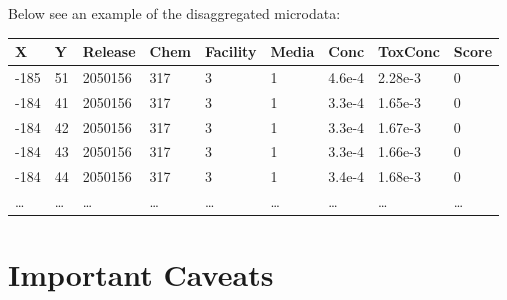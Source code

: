 \documentclass[12pt,twoside]{dukestatscithesis}
\theoremstyle{definition}
\theoremstyle{definition}
\theoremstyle{definition}
\theoremstyle{remark}
\begin{document}
Below see an example of the disaggregated microdata:
\begin{longtable}[]{@{}lllllllll@{}}
\toprule
X & Y & Release & Chem & Facility & Media & Conc & ToxConc &
Score\tabularnewline
\midrule
\endhead
-185 & 51 & 2050156 & 317 & 3 & 1 & 4.6e-4 & 2.28e-3 & 0\tabularnewline
-184 & 41 & 2050156 & 317 & 3 & 1 & 3.3e-4 & 1.65e-3 & 0\tabularnewline
-184 & 42 & 2050156 & 317 & 3 & 1 & 3.3e-4 & 1.67e-3 & 0\tabularnewline
-184 & 43 & 2050156 & 317 & 3 & 1 & 3.3e-4 & 1.66e-3 & 0\tabularnewline
-184 & 44 & 2050156 & 317 & 3 & 1 & 3.4e-4 & 1.68e-3 & 0\tabularnewline
\ldots{} & \ldots{} & \ldots{} & \ldots{} & \ldots{} & \ldots{} &
\ldots{} & \ldots{} & \ldots{}\tabularnewline
\bottomrule
\end{longtable}
\section{Important Caveats}\label{important-caveats}
\end{document}
